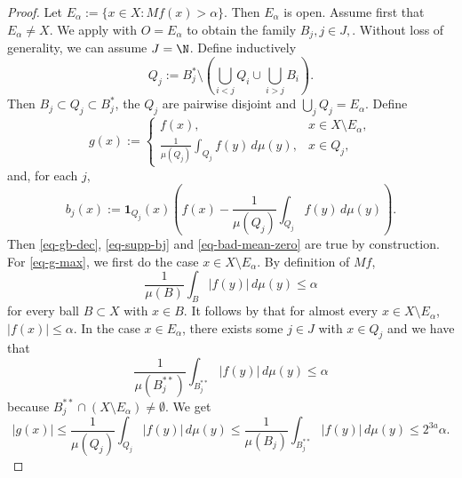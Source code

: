 \begin{proof}
Let $E_\alpha:=\{x\in X: Mf(x)>\alpha\}$.
Then $E_\alpha$ is open. Assume first that $E_\alpha \ne X$. We apply  with $O=E_\alpha$ to obtain the family $B_j, j\in J,$. Without loss of generality, we can assume $J=\N$. Define inductively
\begin{equation}
    Q_j := B_j^* \setminus \left(\bigcup_{i<j} Q_i \cup \bigcup_{i>j} B_i \right).
\end{equation}
Then $B_j\subset Q_j\subset B_j^*$, the $Q_j$ are pairwise disjoint and $\bigcup_j Q_j = E_\alpha$.
Define
\begin{equation}
    \label{eq-g-def}
    g(x):=\begin{cases}
     f(x), & x\in X\setminus E_\alpha,\\
     \frac{1}{\mu(Q_j)}\int_{Q_j} f(y)\, d\mu(y), &x\in Q_j,
    \end{cases}
\end{equation}
and, for each $j$,
\begin{equation}
    b_j(x):= \mathbf{1}_{Q_j}(x) \left(f(x)-\frac{1}{\mu(Q_j)}\int_{Q_j} f(y)\, d\mu(y) \right).
\end{equation}
Then \eqref{eq-gb-dec}, \eqref{eq-supp-bj} and \eqref{eq-bad-mean-zero} are true by construction.
For \eqref{eq-g-max}, we first do the case $x\in X\setminus E_\alpha$. By definition of $Mf$,
\begin{equation}
    \frac{1}{\mu(B)}\int_B |f(y)|\,d\mu(y) \le \alpha
\end{equation}
for every ball $B\subset X$ with $x\in B$. It follows by  that for almost every $x\in X\setminus E_\alpha$, $|f(x)|\le \alpha$.
In the case $x\in E_\alpha$, there exists some $j\in J$ with $x\in Q_j$ and we have that
\begin{equation}
    \label{large-ball-estimate}
    \frac{1}{\mu(B_j^{**})} \int_{B_j^{**}} |f(y)| \,d\mu(y) \le \alpha
\end{equation}
because $B_j^{**}\cap (X\setminus E_\alpha) \ne \emptyset$. We get
\begin{equation}
    |g(x)| \le \frac{1}{\mu(Q_j)}\int_{Q_j} |f(y)|\, d\mu(y) \le \frac{1}{\mu(B_j)}\int_{B_j^{**}} |f(y)| \, d\mu(y) \le 2^{3a}\alpha .
\end{equation}


\end{proof}
